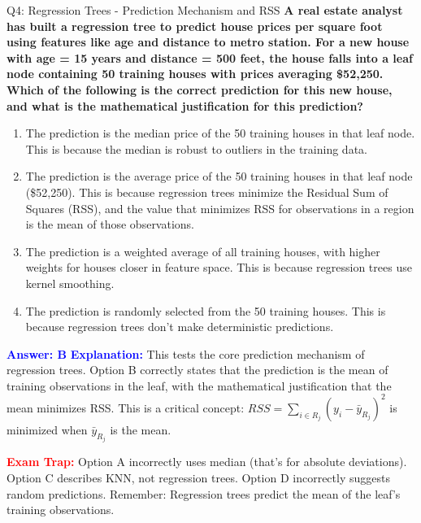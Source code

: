 \documentclass[8pt]{beamer}
\begin{document}
	\begin{frame}{Q4: Regression Trees - Prediction Mechanism and RSS}
		\fontsize{6.5}{7.5}\selectfont
		\textbf{A real estate analyst has built a regression tree to predict house prices per square foot using features like age and distance to metro station. For a new house with age = 15 years and distance = 500 feet, the house falls into a leaf node containing 50 training houses with prices averaging \$52,250. Which of the following is the correct prediction for this new house, and what is the mathematical justification for this prediction?}
		
		\begin{enumerate}
			\item The prediction is the median price of the 50 training houses in that leaf node. This is because the median is robust to outliers in the training data.
			\item The prediction is the average price of the 50 training houses in that leaf node (\$52,250). This is because regression trees minimize the Residual Sum of Squares (RSS), and the value that minimizes RSS for observations in a region is the mean of those observations.
			\item The prediction is a weighted average of all training houses, with higher weights for houses closer in feature space. This is because regression trees use kernel smoothing.
			\item The prediction is randomly selected from the 50 training houses. This is because regression trees don't make deterministic predictions.
		\end{enumerate}
		
		\vspace{0.1cm}
		\textcolor{blue}{\textbf{Answer: B}}
		\vspace{0.1cm}
		\textcolor{blue}{\textbf{Explanation:}} This tests the core prediction mechanism of regression trees. Option B correctly states that the prediction is the mean of training observations in the leaf, with the mathematical justification that the mean minimizes RSS. This is a critical concept: $RSS = \sum_{i \in R_j} (y_i - \bar{y}_{R_j})^2$ is minimized when $\bar{y}_{R_j}$ is the mean.
		
		\textcolor{red}{\textbf{Exam Trap:}} Option A incorrectly uses median (that's for absolute deviations). Option C describes KNN, not regression trees. Option D incorrectly suggests random predictions. Remember: Regression trees predict the mean of the leaf's training observations.
	\end{frame}
	
\end{document}
